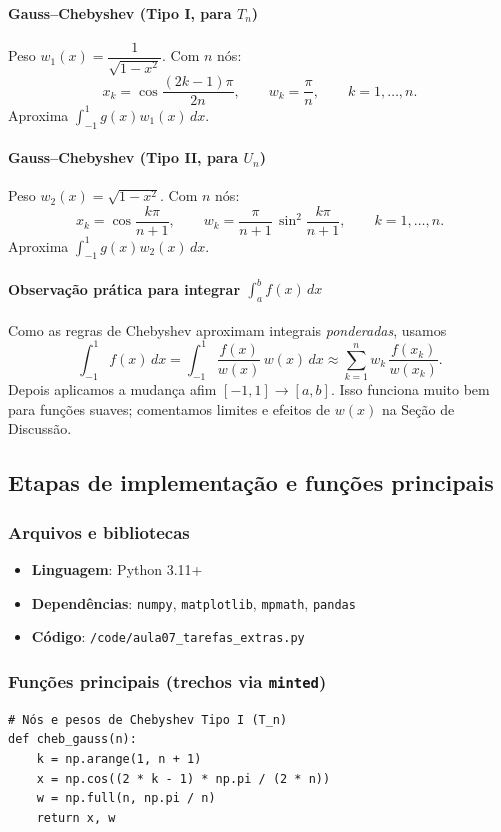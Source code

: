 \documentclass[12pt,a4paper]{article}
\begin{document}
\paragraph{Gauss–Chebyshev (Tipo I, para \(T_n\))}
Peso \(w_1(x)=\dfrac{1}{\sqrt{1-x^2}}\). Com \(n\) nós:
\[
x_k=\cos\frac{(2k-1)\pi}{2n},\qquad
w_k=\frac{\pi}{n},\qquad k=1,\dots,n.
\]
Aproxima \(\int_{-1}^1 g(x) w_1(x)\,dx\).

\paragraph{Gauss–Chebyshev (Tipo II, para \(U_n\))}
Peso \(w_2(x)=\sqrt{1-x^2}\). Com \(n\) nós:
\[
x_k=\cos\frac{k\pi}{n+1},\qquad
w_k=\frac{\pi}{n+1}\,\sin^2\!\frac{k\pi}{n+1},\qquad k=1,\dots,n.
\]
Aproxima \(\int_{-1}^1 g(x) w_2(x)\,dx\).

\paragraph{Observação prática para integrar \(\int_a^b f(x)\,dx\)}
Como as regras de Chebyshev aproximam integrais \emph{ponderadas}, usamos
\[
\int_{-1}^{1} f(x)\,dx
= \int_{-1}^{1} \frac{f(x)}{w(x)}\, w(x)\,dx
\approx \sum_{k=1}^{n} w_k\, \frac{f(x_k)}{w(x_k)}.
\]
Depois aplicamos a mudança afim \([-1,1]\to [a,b]\).
Isso funciona muito bem para funções suaves; comentamos limites e efeitos de \(w(x)\) na Seção de Discussão.

\subsection{Etapas de implementação e funções principais}
\subsubsection*{Arquivos e bibliotecas}
\begin{itemize}
  \item \textbf{Linguagem}: Python 3.11+
  \item \textbf{Dependências}: \texttt{numpy}, \texttt{matplotlib}, \texttt{mpmath}, \texttt{pandas}
  \item \textbf{Código}: \texttt{/code/aula07\_tarefas\_extras.py}
\end{itemize}

\subsubsection*{Funções principais (trechos via \texttt{minted})}
\begin{verbatim}
# Nós e pesos de Chebyshev Tipo I (T_n)
def cheb_gauss(n):
    k = np.arange(1, n + 1)
    x = np.cos((2 * k - 1) * np.pi / (2 * n))
    w = np.full(n, np.pi / n)
    return x, w
\end{verbatim}
\end{document}

